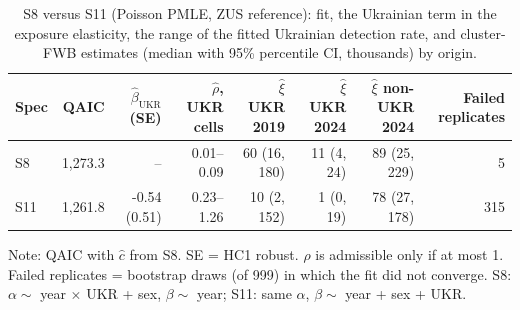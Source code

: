 \begin{table}[ht!]
\caption{\label{tbl-s11-identification}S8 versus S11 (Poisson PMLE, ZUS reference): fit, the Ukrainian term in the exposure elasticity, the range of the fitted Ukrainian detection rate, and cluster-FWB estimates (median with 95\% percentile CI, thousands) by origin.} 
\fontsize{8.0pt}{9.0pt}\selectfont
\begin{tabular*}{\linewidth}{@{\extracolsep{\fill}}lrrrrrrr}
\toprule
Spec & QAIC & $\hat\beta_{\text{UKR}}$ (SE) & $\hat\rho$, UKR cells & $\hat\xi$ UKR 2019 & $\hat\xi$ UKR 2024 & $\hat\xi$ non-UKR 2024 & Failed replicates \\ 
\midrule\addlinespace[2.5pt]
S8 & 1,273.3 & -- & 0.01--0.09 & 60 (16, 180) & 11 (4, 24) & 89 (25, 229) & 5 \\ 
S11 & 1,261.8 & -0.54 (0.51) & 0.23--1.26 & 10 (2, 152) & 1 (0, 19) & 78 (27, 178) & 315 \\ 
\bottomrule
\end{tabular*}
\begin{minipage}{\linewidth}
\vspace{.05em}
Note: QAIC with $\hat c$ from S8. SE = HC1 robust. $\hat\rho$ is admissible only if at most 1. Failed replicates = bootstrap draws (of 999) in which the fit did not converge. S8: $\alpha \sim$ year $\times$ UKR + sex, $\beta \sim$ year; S11: same $\alpha$, $\beta \sim$ year + sex + UKR.\\
\end{minipage}
\end{table}

